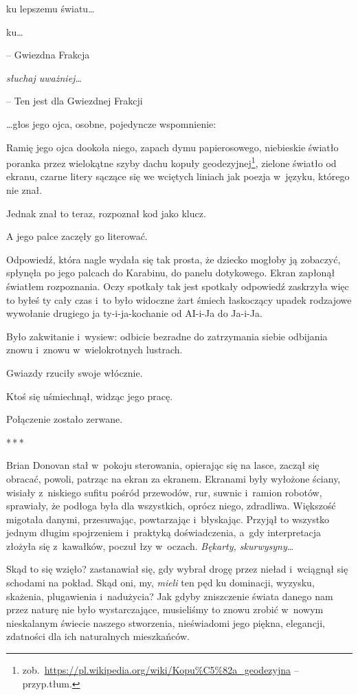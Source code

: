 \documentclass[oneside,polish,11pt,sfheadings]{mwbk}
\newcommand{\threeast}{\bigskip\par\centerline{*\,*\,*}\medskip\par}%
\begin{document}
ku lepszemu światu\ldots

ku\ldots

-- Gwiezdna Frakcja

\emph{słuchaj uważniej\ldots}

-- Ten jest dla Gwiezdnej Frakcji

\ldots głos jego ojca, osobne, pojedyncze wspomnienie:

Ramię jego ojca dookoła niego, zapach dymu papierosowego, niebieskie
światło poranka przez wielokątne szyby dachu kopuły geodezyjnej\footnote{
zob.~\url{https://pl.wikipedia.org/wiki/Kopu\%C5\%82a\_geodezyjna}
-- przyp.tłum.}, zielone światło od ekranu, czarne litery sączące się we
wciętych liniach jak poezja w~języku, którego nie znał.

Jednak znał to teraz, rozpoznał kod jako klucz.

A jego palce zaczęły go literować.

Odpowiedź, która nagle wydała się tak prosta, że dziecko mogłoby ją
zobaczyć, spłynęła po jego palcach do Karabinu, do panelu dotykowego.
Ekran zapłonął światłem rozpoznania. Oczy spotkały tak jest spotkały
odpowiedź zaskrzyła więc to byłeś ty cały czas i~to było widoczne żart
śmiech łaskoczący upadek rodzajowe wywołanie drugiego ja
ty-i-ja-kochanie od AI-i-Ja do Ja-i-Ja.

Było zakwitanie i~wysiew: odbicie bezradne do zatrzymania siebie
odbijania znowu i~znowu w~wielokrotnych lustrach.

Gwiazdy rzuciły swoje włócznie.

Ktoś się uśmiechnął, widząc jego pracę.

Połączenie zostało zerwane.
  \threeast 

Brian Donovan stał w~pokoju sterowania, opierając się na lasce, zaczął
się obracać, powoli, patrząc na ekran za ekranem. Ekranami były wyłożone
ściany, wisiały z~niskiego sufitu pośród przewodów, rur, suwnic i~ramion
robotów, sprawiały, że podłoga była dla wszystkich, oprócz niego,
zdradliwa. Większość migotała danymi, przesuwając, powtarzając i~błyskając. Przyjął to wszystko jednym długim spojrzeniem i~praktyką
doświadczenia, a~gdy interpretacja złożyła się z~kawałków, poczuł łzy w~oczach. \emph{Bękarty, skurwysyny}\ldots

Skąd to się wzięło? zastanawiał się, gdy wybrał drogę przez nieład i~wciągnął się schodami na pokład. Skąd oni, my, \emph{mieli }ten pęd ku
dominacji, wyzysku, skażenia, plugawienia i~nadużycia? Jak gdyby
zniszczenie świata danego nam przez naturę nie było wystarczające,
musieliśmy to znowu zrobić w~nowym nieskalanym świecie naszego
stworzenia, nieświadomi jego piękna, elegancji, zdatności dla ich
naturalnych mieszkańców.
\end{document}
